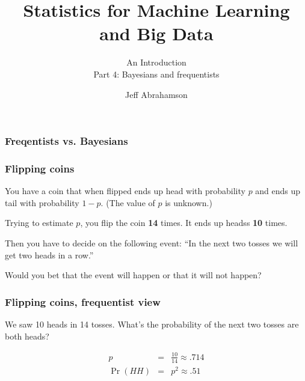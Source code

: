 \documentclass[t]{beamer}
\title
{Statistics for Machine Learning and Big Data}
\subtitle{An Introduction\\[6mm] Part 4: Bayesians and frequentists}
\author[Abrahamson] {Jeff Abrahamson}
\begin{document}
\begin{frame}
  \titlepage
\end{frame}

\begin{frame}

\end{frame}

\begin{frame}
  \frametitle{Freqentists vs. Bayesians}

  \vfill
  \centerline{}
\end{frame}


\begin{frame}
  \frametitle{Flipping coins}

  You have a coin that when flipped ends up head with probability $p$
  and ends up tail with probability $1-p$. (The value of $p$ is
  unknown.)

  Trying to estimate $p$, you flip the coin \textbf{14} times. It ends
  up headss \textbf{10} times.

  Then you have to decide on the following event: ``In the next two
  tosses we will get two heads in a row.''

  Would you bet that the event will happen or that it will not happen?

  \vfill

  \note{

  }
\end{frame}

\begin{frame}
  \frametitle{Flipping coins, frequentist view}

  We saw 10 heads in 14 tosses.  What's the probability of the next two tosses are both heads?

  \begin{eqnarray*}
    p & = & \frac{10}{14} \approx .714\\[5mm]
    \Pr(HH) & = & p^2 \approx .51
  \end{eqnarray*}

\end{frame}
\end{document}
